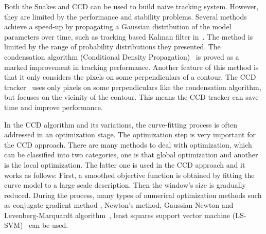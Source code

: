 Both the Snakes and CCD can be used to build naive tracking
system. However, they are limited by the performance and stability
problems. Several methods achieve a speed-up by propagating a Gaussian
distribution of the model parameters over time, such as tracking based
Kalman filter in~\cite{brookner1998tracking}. The method is limited by the range of probability
distributions they presented. The condensation algorithm (Conditional
Density Propagation)~\cite{isard1998icondensation} is proved as a marked improvement in tracking performance. Another feature of
this method is that it only considers the pixels on some
perpendiculars of a contour. The CCD tracker~\cite{hanek2004fitting} uses only
pixels on some perpendiculars like the condensation algorithm, but
focuses on the vicinity of the contour. This means the CCD tracker can
save time and improve performance.

In the CCD algorithm and its variations, the curve-fitting process is
often addressed in an optimization stage. The optimization step is
very important for the CCD approach. There are many methods to
deal with optimization, which can be classified into two
categories, one is that global optimization and another is the local
optimization. The latter one is used in the CCD
approach and it works as follows: First, a smoothed objective function is obtained by fitting
the curve model to a large scale description. Then the window's size is
gradually reduced. During the process, many types of  numerical
optimization methods such as  conjugate gradient method , Newton's
method, Gaussian-Newton and Levenberg-Marquardt
algorithm~\cite{contourpanin2011}, least squares support vector
machine (LS-SVM)~\cite{vapnik2000nature} can be used.
